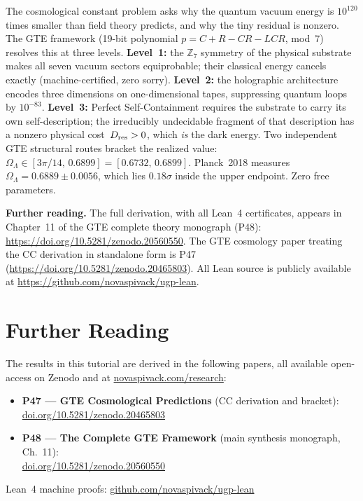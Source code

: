 \documentclass[11pt,a4paper]{article}
\newcommand{\OmL}{\Omega_\Lambda}
\newcommand{\Dres}{D_{\rm res}}
\newcommand{\ZS}{\mathbb{Z}_7}
\begin{document}
\begin{tcolorbox}[colback=boxgreen,colframe=green!50!black,
  title={One-paragraph summary for the reader in a hurry}]
The cosmological constant problem asks why the quantum vacuum energy is
$10^{120}$ times smaller than field theory predicts, and why the tiny residual
is nonzero.  The GTE framework (19-bit polynomial $p = C{+}R{-}CR{-}LCR$,
mod~7) resolves this at three levels.  \textbf{Level~1:} the $\ZS$ symmetry of
the physical substrate makes all seven vacuum sectors equiprobable;
their classical energy cancels exactly (machine-certified, zero sorry).
\textbf{Level~2:} the holographic architecture encodes three dimensions on one-dimensional
tapes, suppressing quantum loops by $10^{-83}$.  \textbf{Level~3:}
Perfect Self-Containment requires the substrate to carry its own self-description;
the irreducibly undecidable fragment of that description has a nonzero physical
cost~$\Dres > 0$, which \emph{is} the dark energy.  Two independent GTE structural
routes bracket the realized value: $\OmL \in [3\pi/14,\,0.6899]
= [0.6732,\,0.6899]$.  Planck~2018 measures $\OmL = 0.6889 \pm 0.0056$, which
lies $0.18\sigma$ inside the upper endpoint.  Zero free parameters.
\end{tcolorbox}

\bigskip
\noindent
\textbf{Further reading.}
The full derivation, with all Lean~4 certificates, appears in Chapter~11 of
the GTE complete theory monograph (P48):
\url{https://doi.org/10.5281/zenodo.20560550}.
The GTE cosmology paper treating the CC derivation in standalone form is P47~\cite{SpivackGTECosmology}
(\url{https://doi.org/10.5281/zenodo.20465803}).
All Lean source is publicly available at
\url{https://github.com/novaspivack/ugp-lean}.


\section*{Further Reading}
\begin{tcolorbox}[colback=orange!8,colframe=orange!50!black,
  title=\textbf{Primary Sources}]
The results in this tutorial are derived in the following papers,
all available open-access on Zenodo and at
\href{https://novaspivack.com/research}{novaspivack.com/research}:
\begin{itemize}
  \item \textbf{P47 --- GTE Cosmological Predictions} (CC derivation and bracket):\\
        \href{https://doi.org/10.5281/zenodo.20465803}{doi.org/10.5281/zenodo.20465803}
  \item \textbf{P48 --- The Complete GTE Framework} (main synthesis monograph, Ch.~11):\\
        \href{https://doi.org/10.5281/zenodo.20560550}{doi.org/10.5281/zenodo.20560550}
\end{itemize}
Lean~4 machine proofs: \href{https://github.com/novaspivack/ugp-lean}{github.com/novaspivack/ugp-lean}
\end{tcolorbox}


\end{document}
